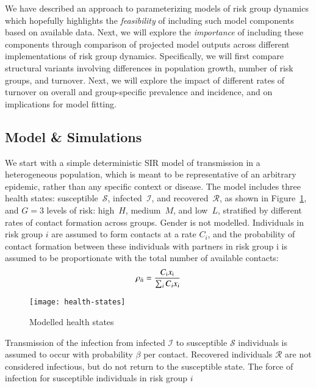 We have described an approach to parameterizing models of risk group dynamics
which hopefully highlights the
\textit{feasibility} of including such model components based on available data.
Next, we will explore the
\textit{importance} of including these components
through comparison of projected model outputs
across different implementations of risk group dynamics.
Specifically, we will first compare structural variants
involving differences in population growth, number of risk groups, and turnover.
Next, we will explore the impact of different rates of turnover on
overall and group-specific prevalence and incidence,
and on implications for model fitting.
\subsection{Model \& Simulations}\label{ss:model-sim}
We start with a simple deterministic SIR model of
transmission in a heterogeneous population,
which is meant to be representative of an arbitrary epidemic,
rather than any specific context or disease.
The model includes three health states:
susceptible~$\mathcal{S}$, infected~$\mathcal{I}$, and recovered~$\mathcal{R}$,
as shown in Figure~\ref{fig:health-states},
and $G = 3$ levels of risk:
high~$H$, medium~$M$, and low~$L$,
stratified by different rates of contact formation across groups.
Gender is not modelled.
Individuals in risk group $i$ are assumed to
form contacts at a rate $C_{i}$, and
the probability of contact formation between these individuals
with partners in risk group $\mathrm{i}$ is assumed to
be proportionate with the total number of available contacts:
\begin{equation}
  \rho_{\mathit{i}\mathrm{i}} = \frac
    {C_{\mathrm{i}} x_{\mathrm{i}}}
    {\sum_{\textsl{i}}C_{\textsl{i}} x_{\textsl{i}}}
\end{equation}
\begin{figure}
  \centering
  \texttt{[image: health-states]}
  \caption{Modelled health states}
  \label{fig:health-states}
\end{figure}
\par
Transmission of the infection from infected $\mathcal{I}$ to susceptible $\mathcal{S}$ individuals
is assumed to occur with probability $\beta$ per contact.
Recovered individuals $\mathcal{R}$ are not considered infectious,
but do not return to the susceptible state.
The force of infection for susceptible individuals in risk group $i$
